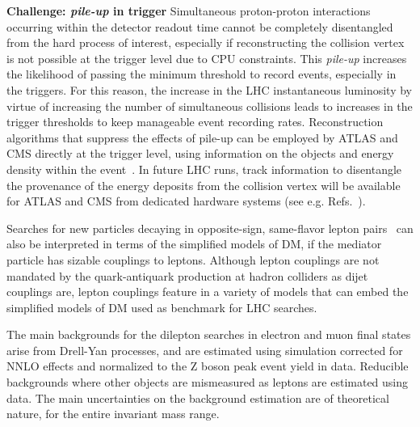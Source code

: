 \begin{textbox}[!h]
\textbf{Challenge: \textit{pile-up} in trigger} Simultaneous proton-proton interactions occurring within the detector
readout time cannot be completely disentangled from the hard process
of interest, especially if reconstructing the collision vertex
is not possible at the trigger level due to CPU constraints. 
This \textit{pile-up} increases the likelihood of passing 
the minimum threshold to record events, especially in the \MET triggers.
For this reason, the increase in the LHC instantaneous luminosity by virtue
of increasing the number of simultaneous
collisions leads to increases in the trigger thresholds to
keep manageable event recording rates. Reconstruction algorithms that suppress
the effects of pile-up can be employed by ATLAS and CMS directly at the trigger level,
using information on the objects and energy density within the event~\cite{CMS:2014ata,ATLAS-CONF-2014-019}. 
In future LHC runs, track information to disentangle the provenance of the 
energy deposits from the collision vertex will be available for
ATLAS and CMS from dedicated hardware systems (see e.g. Refs.~\cite{Shochet:2013gaw,1748-0221-6-12-C12065}). 
\end{textbox}

Searches for new particles decaying in opposite-sign, same-flavor lepton pairs~\cite{Aaboud:2017buh,Khachatryan:2016zqb} can also be interpreted in terms of the simplified models of DM, 
if the mediator particle has sizable couplings to leptons. Although lepton couplings
are not mandated by the quark-antiquark production at hadron colliders as dijet couplings are, 
lepton couplings feature in a variety of models that can embed
the simplified models of DM used as benchmark for LHC searches. %

The main backgrounds for the dilepton searches in electron and muon final states 
arise from Drell-Yan processes, and are estimated using simulation corrected for NNLO effects and normalized to the Z boson peak event yield in data. 
Reducible backgrounds where other objects are mismeasured as leptons are estimated using data. The main uncertainties on the background estimation are of theoretical nature, for the entire invariant mass range. 

